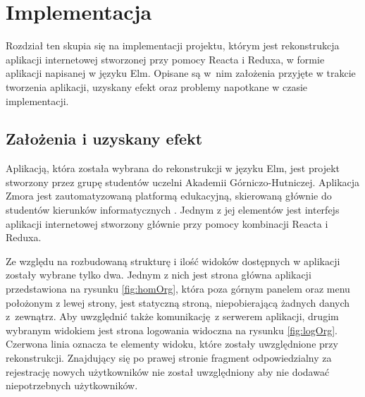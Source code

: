 \chapter{Implementacja} \label{chap:implementacja}
Rozdział ten skupia się na implementacji projektu, którym jest rekonstrukcja aplikacji internetowej stworzonej przy pomocy Reacta i Reduxa, w formie aplikacji napisanej w języku Elm. Opisane są w~nim założenia przyjęte w trakcie tworzenia aplikacji, uzyskany efekt oraz problemy napotkane w czasie implementacji.

\section{Założenia i uzyskany efekt}
Aplikacją, która została wybrana do rekonstrukcji w języku Elm, jest projekt stworzony przez grupę studentów uczelni Akademii Górniczo-Hutniczej. Aplikacja Zmora jest zautomatyzowaną platformą edukacyjną, skierowaną głównie do studentów kierunków informatycznych \cite{zmoraUi}. Jednym z jej elementów jest interfejs aplikacji internetowej stworzony głównie przy pomocy kombinacji Reacta i Reduxa.

Ze względu na rozbudowaną strukturę i ilość widoków dostępnych w aplikacji zostały wybrane tylko dwa. Jednym z nich jest strona główna aplikacji przedstawiona na rysunku \ref{fig:homOrg}, która poza górnym panelem oraz menu położonym z lewej strony, jest statyczną stroną, niepobierającą żadnych danych z~zewnątrz. Aby uwzględnić także komunikację z serwerem aplikacji, drugim wybranym widokiem jest strona logowania widoczna na rysunku \ref{fig:logOrg}. Czerwona linia oznacza te elementy widoku, które zostały uwzględnione przy rekonstrukcji. Znajdujący się po prawej stronie fragment odpowiedzialny za rejestrację nowych użytkowników nie został uwzględniony aby nie dodawać niepotrzebnych użytkowników.

